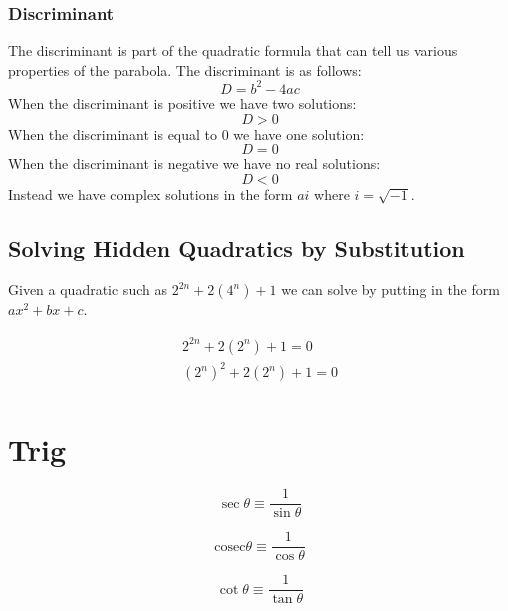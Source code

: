 \documentclass{article}
\begin{document}
\subsubsection{Discriminant}
The discriminant is part of the quadratic formula that can tell us various properties of the parabola.
The discriminant is as follows:
\begin{equation}
	D = b^2 - 4ac
\end{equation}
When the discriminant is positive we have two solutions:
\begin{equation}
	D > 0
\end{equation}
When the discriminant is equal to $0$ we have one solution:
\begin{equation}
	D = 0
\end{equation}
When the discriminant is negative we have no real solutions:
\begin{equation}
	D < 0
\end{equation}
Instead we have complex solutions in the form $ai$ where $i = \sqrt{-1}$.

\subsection{Solving Hidden Quadratics by Substitution}

Given a quadratic such as $2^{2n} + 2 \left ( 4^{n} \right ) + 1$ we can solve by putting in the form
$ax^2 + bx + c$.

\begin{gather}
	2^{2n} + 2 \left ( 2^{n} \right ) + 1 = 0 \\
	\left ( 2^n \right ) ^2 + 2 \left (2^n \right ) + 1 = 0 \\
\end{gather}

\section{Trig}

\begin{equation}
	\sec \theta \equiv \frac{1}{\sin \theta}
\end{equation}


\begin{equation}
	\mathrm{cosec} \theta \equiv \frac{1}{\cos \theta}
\end{equation}

\begin{equation}
	\cot \theta \equiv \frac{1}{\tan \theta}
\end{equation}
\end{document}
